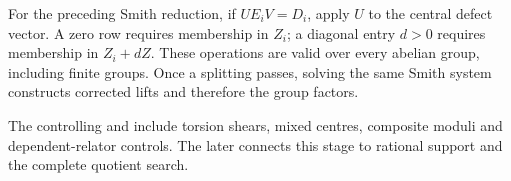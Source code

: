 For the preceding Smith reduction, if $UE_iV=D_i$, apply $U$ to the
central defect vector. A zero row requires membership in $Z_i$;
a diagonal entry $d>0$ requires membership in $Z_i+dZ$. These operations
are valid over every abelian group, including finite groups. Once a
splitting passes, solving the same Smith system constructs corrected
lifts and therefore the group factors.

The controlling  and
 include
torsion shears, mixed centres, composite moduli and dependent-relator
controls. The later
connects this stage to rational support and the complete quotient search.

